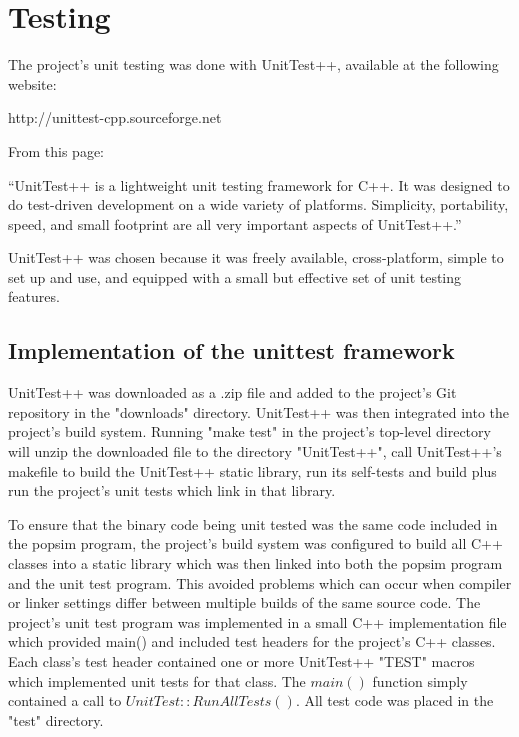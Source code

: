 \section{Testing}
\label{Testing}

The project's unit testing was done with UnitTest++, available at the following website:
\begin{center}
 http://unittest-cpp.sourceforge.net
\end{center}
From this page:
\begin{center}
``UnitTest++ is a lightweight unit testing framework for C++.  It was designed to do test-driven development on a wide variety of platforms. Simplicity, portability, speed, and small footprint are all very important aspects of UnitTest++.''
\end{center}

UnitTest++ was chosen because it was freely available, cross-platform, simple to set up and use, and equipped with a small but effective set of unit testing features.
\subsection{Implementation of the unittest framework}
UnitTest++ was downloaded as a .zip file and added to the project's Git repository in the "downloads" directory.
UnitTest++ was then integrated into the project's build system.
Running "make test" in the project's top-level directory will unzip the downloaded file to the directory "UnitTest++", call UnitTest++'s makefile to build the UnitTest++ static library, run its self-tests and build plus run the project's unit tests which link in that library.

To ensure that the binary code being unit tested was the same code included in the popsim program, the project's build system was configured to build all C++ classes into a static library which was then linked into both the popsim program and the unit test program. This avoided problems which can occur when compiler or linker settings differ between multiple builds of the same source code.
The project's unit test program was implemented in a small C++ implementation file which provided main() and included test headers for the project's C++ classes.  Each class's test header contained one or more UnitTest++ "TEST" macros which implemented unit tests for that class.  The $main()$ function simply contained a call to $UnitTest::RunAllTests()$. All test code was placed in the "test" directory.

